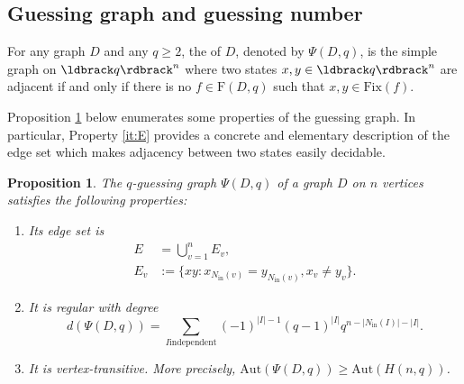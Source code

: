 \documentclass[a4paper, 11pt]{book}
\numberwithin{equation}{section}
\theoremstyle{plain}
\newtheorem{proposition}[equation]	{Proposition}
\newcommand{\neighbourhood}{N}
\newcommand{\inn}[1]{#1_\mathrm{in}}
\newcommand{\NIn}{\inn{\neighbourhood}}
\newcommand{\functions}{\mathrm{F}}
\newcommand{\Fix}{\mathrm{Fix}}
\newcommand{\guessingGraph}{\Psi}
\newcommand{\Aut}{\mathrm{Aut}}
\renewcommand{\(}{\ldbrack}
\renewcommand{\)}{\rdbrack}
\newcommand{\BF}[1]{{\bf\boldmath{#1}\unboldmath}}
\begin{document}
\subsection{Guessing graph and guessing number} \label{sec:guessing_graph_definition}


For any graph $D$ and any $q \ge 2$, the \BF{$q$-guessing graph} of $D$, denoted by $\guessingGraph(D,q)$, is the simple graph on $\(q\)^n$ where two states $x, y \in \(q\)^n$ are adjacent if and only if there is no $f \in \functions(D,q)$ such that $x, y \in \Fix(f)$.

Proposition \ref{prop:properties_guessing_graph} below enumerates some properties of the guessing graph. In particular, Property \ref{it:E} provides a concrete and elementary description of the edge set which makes adjacency between two states easily decidable.

\begin{proposition} \label{prop:properties_guessing_graph}
The $q$-guessing graph $\guessingGraph(D,q)$ of a graph $D$ on $n$ vertices satisfies the following properties:
\begin{enumerate}
    \item \label{it:E} Its edge set is 
	\begin{align*}
		E &= \bigcup_{v=1}^n E_v,\\
		E_v &:= \{xy : x_{\NIn(v)} = y_{\NIn(v)}, x_v \ne y_v\}.
	\end{align*}
	
	\item \label{it:d(D,q)} It is regular with degree
	\[
		d(\guessingGraph(D,q)) = \sum_{I \mathrm{independent}} (-1)^{|I|-1} (q-1)^{|I|} q^{n - |\NIn(I)| - |I|}.
	\]
	
	\item \label{it:vertex_transitive} It is vertex-transitive. More precisely, $\Aut(\guessingGraph(D,q)) \ge \Aut(H(n,q))$. 
\end{enumerate}
\end{proposition}
\end{document}
